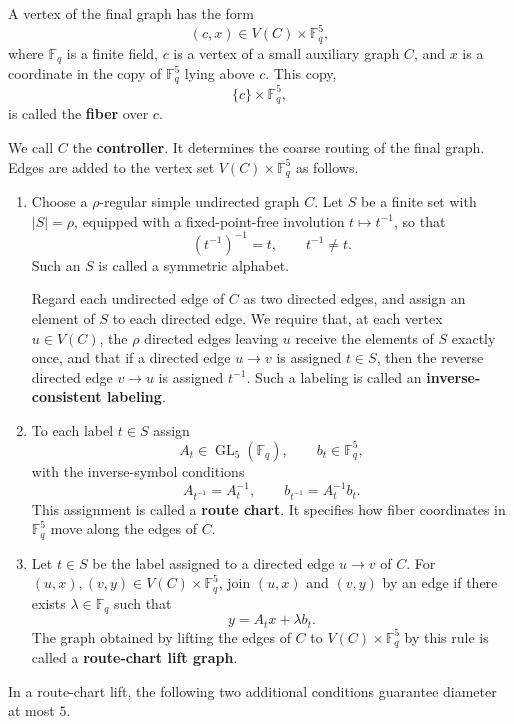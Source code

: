 \documentclass[11pt]{article}
\theoremstyle{definition}
\theoremstyle{remark}
\renewcommand{\_}{\textunderscore\allowbreak}
\begin{document}
A vertex of the final graph has the form \[
  (c,x)\in V(C)\times\mathbb F_q^5 ,
\] where \(\mathbb F_q\) is a finite field, \(c\) is a vertex of a small
auxiliary graph \(C\), and \(x\) is a coordinate in the copy of
\(\mathbb F_q^5\) lying above \(c\). This copy, \[
  \{c\}\times\mathbb F_q^5,
\] is called the \textbf{fiber} over \(c\).

We call \(C\) the \textbf{controller}. It determines the coarse routing
of the final graph. Edges are added to the vertex set
\(V(C)\times\mathbb F_q^5\) as follows.

\begin{enumerate}
\def\labelenumi{\arabic{enumi}.}
\item
  Choose a \(\rho\)-regular simple undirected graph \(C\). Let \(S\) be
  a finite set with \(|S|=\rho\), equipped with a fixed-point-free
  involution \(t\mapsto t^{-1}\), so that \[
    (t^{-1})^{-1}=t,\qquad t^{-1}\ne t .
  \] Such an \(S\) is called a symmetric alphabet.

  Regard each undirected edge of \(C\) as two directed edges, and assign
  an element of \(S\) to each directed edge. We require that, at each
  vertex \(u\in V(C)\), the \(\rho\) directed edges leaving \(u\)
  receive the elements of \(S\) exactly once, and that if a directed
  edge \(u\to v\) is assigned \(t\in S\), then the reverse directed edge
  \(v\to u\) is assigned \(t^{-1}\). Such a labeling is called an
  \textbf{inverse-consistent labeling}.
\item
  To each label \(t\in S\) assign \[
    A_t\in\operatorname{GL}_5(\mathbb F_q),
    \qquad
    b_t\in\mathbb F_q^5 ,
  \] with the inverse-symbol conditions \[
    A_{t^{-1}}=A_t^{-1},
    \qquad
    b_{t^{-1}}=A_t^{-1}b_t .
  \] This assignment is called a \textbf{route chart}. It specifies how
  fiber coordinates in \(\mathbb F_q^5\) move along the edges of \(C\).
\item
  Let \(t\in S\) be the label assigned to a directed edge \(u\to v\) of
  \(C\). For \((u,x),(v,y)\in V(C)\times\mathbb F_q^5\), join \((u,x)\)
  and \((v,y)\) by an edge if there exists \(\lambda\in\mathbb F_q\)
  such that \[
    y=A_t x+\lambda b_t .
  \] The graph obtained by lifting the edges of \(C\) to
  \(V(C)\times\mathbb F_q^5\) by this rule is called a
  \textbf{route-chart lift graph}.
\end{enumerate}

In a route-chart lift, the following two additional conditions guarantee
diameter at most \(5\).
\end{document}
